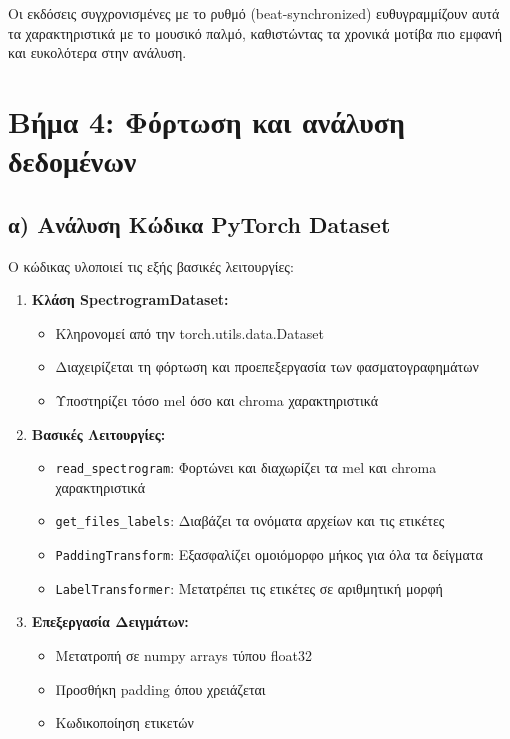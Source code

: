 \documentclass[a4paper,12pt]{article}
\begin{document}
Οι εκδόσεις συγχρονισμένες με το ρυθμό (beat-synchronized) ευθυγραμμίζουν αυτά τα χαρακτηριστικά με το μουσικό παλμό, καθιστώντας τα χρονικά μοτίβα πιο εμφανή και ευκολότερα στην ανάλυση.

\section*{Βήμα 4: Φόρτωση και ανάλυση δεδομένων}

\subsection*{α) Ανάλυση Κώδικα PyTorch Dataset}

Ο κώδικας υλοποιεί τις εξής βασικές λειτουργίες:

\begin{enumerate}
    \item \textbf{Κλάση SpectrogramDataset:}
          \begin{itemize}
              \item Κληρονομεί από την torch.utils.data.Dataset
              \item Διαχειρίζεται τη φόρτωση και προεπεξεργασία των φασματογραφημάτων
              \item Υποστηρίζει τόσο mel όσο και chroma χαρακτηριστικά
          \end{itemize}

    \item \textbf{Βασικές Λειτουργίες:}
          \begin{itemize}
              \item \texttt{read\_spectrogram}: Φορτώνει και διαχωρίζει τα mel και chroma χαρακτηριστικά
              \item \texttt{get\_files\_labels}: Διαβάζει τα ονόματα αρχείων και τις ετικέτες
              \item \texttt{PaddingTransform}: Εξασφαλίζει ομοιόμορφο μήκος για όλα τα δείγματα
              \item \texttt{LabelTransformer}: Μετατρέπει τις ετικέτες σε αριθμητική μορφή
          \end{itemize}

    \item \textbf{Επεξεργασία Δειγμάτων:}
          \begin{itemize}
              \item Μετατροπή σε numpy arrays τύπου float32
              \item Προσθήκη padding όπου χρειάζεται
              \item Κωδικοποίηση ετικετών
          \end{itemize}
\end{enumerate}
\end{document}
